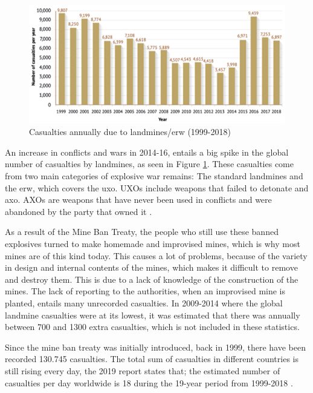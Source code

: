         \vspace{2mm}

\begin{figure}[h]
  \centering
  \includegraphics[width=12.5cm]{00 - Images/casualties_per_year.png}
  \caption{Casualties annually due to landmines/\gls{erw} (1999-2018) \cite{LandmineMonitor2019}}
  \label{fig:casualties_per_year}
\end{figure}

\newpage

An increase in conflicts and wars in 2014-16, entails a big spike in the global number of casualties by landmines, as seen in Figure \ref{fig:casualties_per_year}. These casualties come from two main categories of explosive war remains: The standard landmines and the \gls{erw}, which covers the \gls{uxo}. UXOs include weapons that failed to detonate and \gls{axo}. AXOs are weapons that have never been used in conflicts and were abandoned by the party that owned it \cite{Remnants2019:online}. 

        \vspace{2mm}

As a result of the Mine Ban Treaty, the people who still use these banned explosives turned to make homemade and improvised mines, which is why most mines are of this kind today. This causes a lot of problems, because of the variety in design and internal contents of the mines, which makes it difficult to remove and destroy them. This is due to a lack of knowledge of the construction of the mines. The lack of reporting to the authorities, when an improvised mine is planted, entails many unrecorded casualties. In 2009-2014 where the global landmine casualties were at its lowest, it was estimated that there was annually between 700 and 1300 extra casualties, which is not included in these statistics. 

        \vspace{2mm}

Since the mine ban treaty was initially introduced, back in 1999, there have been recorded 130.745 casualties. The total sum of casualties in different countries is still rising every day, the 2019 report states that; the estimated number of casualties per day worldwide is 18 during the 19-year period from 1999-2018 \cite{LandmineMonitor2019}.

